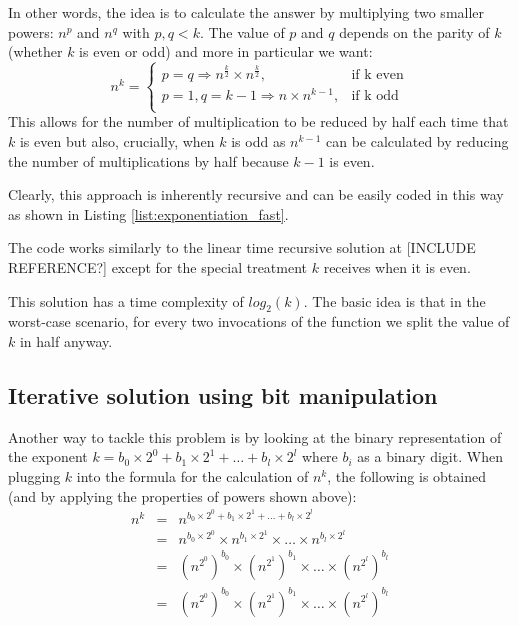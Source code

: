 In other words, the idea is to calculate the answer by multiplying two smaller powers: $n^p$ and $n^q$ with $p,q < k$. The value of $p$ and $q$ depends on the parity of $k$ (whether $k$ is even or odd) and more in particular we want:
  \[
    n^k = \begin{cases}
                p=q \Longrightarrow n^{\frac{k}{2}} \times n^{\frac{k}{2}}, & \text{if  k even}\\
                p=1, q=k-1 \Longrightarrow n \times n^{k-1}, & \text{if k odd}\\
            \end{cases}
  \]
This allows for the number of multiplication to be reduced by half each time that $k$ is even but also,  crucially, when $k$ is odd as $n^{k-1}$ can be calculated by reducing the number of multiplications by half because $k-1$ is even.

Clearly, this approach is inherently recursive and
can be easily coded in this way as shown in Listing \ref{list:exponentiation_fast}.



The code works similarly to the linear time recursive solution at [INCLUDE REFERENCE?]  except for the special treatment $k$ receives when it is even. 

This solution has a time complexity of $log_2(k)$. The basic idea is that in the worst-case scenario, for every two invocations of the  function we split the value of $k$ in half anyway.

\subsection{Iterative solution using bit manipulation}

Another way to tackle this problem is by looking at the binary representation of the exponent $k =
b_0 \times 2^0 + b_1 \times 2^1 + \ldots + b_l \times 2^l$ where $b_i$ as a binary digit.
When plugging $k$ into the formula for the calculation of $n^k$, the following is obtained (and by applying the properties of powers shown above):
\[
    \begin{array}{lcl}
        n^k & = &  n^{b_0 \times 2^0 + b_1 \times 2^1 + \ldots + b_l \times 2^l} \\
        & = & n^{b_0 \times 2^0} \times n^{b_1 \times 2^1} \times \ldots \times n^{b_l \times 2^l} \\
        & = & (n^{2^0})^{b_0} \times  (n^{2^1})^{b_1} \times \ldots \times (n^{2^l})^{b_l} \\
        & = & (n^{2^0})^{b_0} \times  (n^{2^1})^{b_1} \times \ldots \times (n^{2^l})^{b_l} 
    \end{array}
\]

